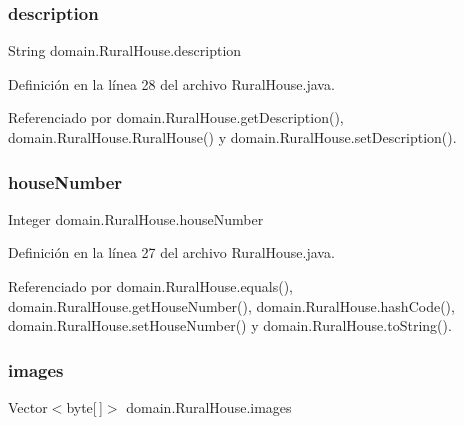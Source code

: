 \subsubsection{\texorpdfstring{description}{description}}
{\footnotesize\ttfamily String domain.\+Rural\+House.\+description\hspace{0.3cm}{\ttfamily [private]}}



Definición en la línea 28 del archivo Rural\+House.\+java.



Referenciado por domain.\+Rural\+House.\+get\+Description(), domain.\+Rural\+House.\+Rural\+House() y domain.\+Rural\+House.\+set\+Description().

\mbox{\label{classdomain_1_1_rural_house_a1168b2c788d2f3bca3c54eee3b8734cb}} 
\subsubsection{\texorpdfstring{houseNumber}{houseNumber}}
{\footnotesize\ttfamily Integer domain.\+Rural\+House.\+house\+Number\hspace{0.3cm}{\ttfamily [private]}}



Definición en la línea 27 del archivo Rural\+House.\+java.



Referenciado por domain.\+Rural\+House.\+equals(), domain.\+Rural\+House.\+get\+House\+Number(), domain.\+Rural\+House.\+hash\+Code(), domain.\+Rural\+House.\+set\+House\+Number() y domain.\+Rural\+House.\+to\+String().

\mbox{\label{classdomain_1_1_rural_house_a6009294a82be0d6cbd824e49479be51a}} 
\subsubsection{\texorpdfstring{images}{images}}
{\footnotesize\ttfamily Vector$<$byte\mbox{[}$\,$\mbox{]}$>$ domain.\+Rural\+House.\+images\hspace{0.3cm}{\ttfamily [private]}}



